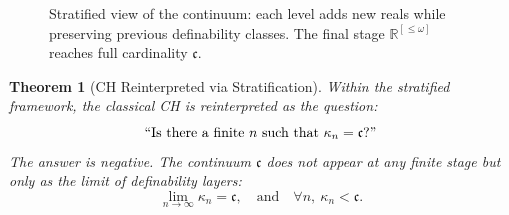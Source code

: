 \documentclass[12pt]{article}
\theoremstyle{definition}
\theoremstyle{plain}
\newtheorem{theorem}[definition]{Theorem}
\theoremstyle{remark}
\begin{document}
\begin{figure}[ht]
\centering
{}
\caption{Stratified view of the continuum: each level adds new reals while preserving previous definability classes. The final stage $\mathbb{R}^{[\leq \omega]}$ reaches full cardinality $\mathfrak{c}$.}
\label{fig:cardinal-stratification}
\end{figure}


\begin{theorem}[CH Reinterpreted via Stratification]
\label{thm:stratified-ch}
Within the stratified framework, the classical CH is reinterpreted as the question: 
\[
    \text{“Is there a finite \( n \) such that } \kappa_n = \mathfrak{c} \text{?”}
\]
The answer is negative. The continuum \( \mathfrak{c} \) does not appear at any finite stage but only as the limit of definability layers:
\[
    \lim_{n \to \infty} \kappa_n = \mathfrak{c}, \quad \text{and} \quad \forall n,\ \kappa_n < \mathfrak{c}.
\]
\end{theorem}
\end{document}
